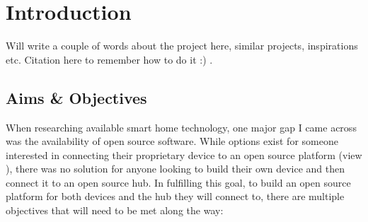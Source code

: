 \chapter{Introduction} \label{cha:intro}
Will write a couple of words about the project 
here, similar projects, inspirations etc. Citation here to remember how to do it 
:)
\cite{lulcs,PapacchiniCaminatiHu23}.

\section{Aims \& Objectives} \label{sec:intro:aims}
When researching available smart home technology, one major gap I came across 
was the availability of open source software. While options exist for someone 
interested in connecting their proprietary device to an open source platform 
(view ), there was no solution for anyone looking to 
build their own device and then connect it to an open source hub. In fulfilling 
this goal, to build an open source platform for both devices and the hub they 
will connect to, there are multiple objectives that will need to be met along 
the way:

